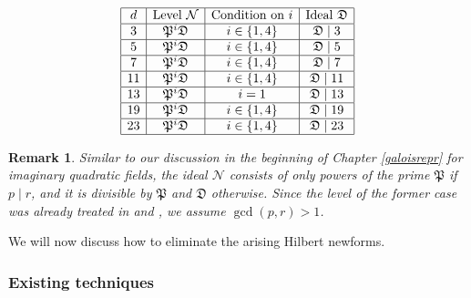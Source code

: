 \documentclass[]{article}
\newtheorem{remark}{Remark}
\newcommand {\mfp}{{\mathfrak{P}}}
\begin{document}
\begin{table}
$$\begin{array}{|c|c|c|c|}
\hline d & \text{Level  $\mathcal{N}$}  &\text{Condition on $i$} &\text{Ideal $\mathfrak{D}$}\\
\hline 3 & \mfp^i\mathfrak{D}  & i\in\{1,4\}  & \mathfrak{D}\mid 3\\
\hline 5 & \mfp^i\mathfrak{D} & i\in\{1,4\} & \mathfrak{D}\mid5 \\
\hline 7 & \mfp^i\mathfrak{D}  & i\in\{1,4\} & \mathfrak{D}\mid7\\
\hline 11 & \mfp^i\mathfrak{D}  & i\in\{1,4\}  & \mathfrak{D}\mid11\\
\hline 13 & \mfp^i\mathfrak{D} & i=1  & \mathfrak{D}\mid13\\
\hline 19 & \mfp^i\mathfrak{D} & i\in\{1,4\} & \mathfrak{D}\mid19 \\
\hline 23 & \mfp^i\mathfrak{D} & i\in\{1,4\}& \mathfrak{D}\mid23  \\
\hline
\end{array}$$
\caption{Lowered level $\mathcal{N}$}
\label{loweredleveltable}
\end{table}


\begin{remark}
    Similar to our discussion in the beginning of Chapter \ref{galoisrepr} for imaginary quadratic fields, the ideal $\mathcal{N}$ consists of only powers of the prime $\mfp$ if $p\mid r$, and it is divisible by $\mfp$ and $\mathfrak{D}$ otherwise. Since the level of the former case was already treated in \cite{freitas2015fermat} and \cite{michaud2021fermat}, we assume $\gcd(p,r)>1$.
\end{remark}


We will now discuss how to eliminate the arising Hilbert newforms.

\subsubsection{Existing techniques}\label{techniques}
\end{document}
